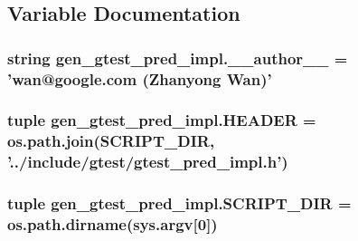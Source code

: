 \subsection{Variable Documentation}
\hypertarget{namespacegen__gtest__pred__impl_af32e92d473ee6c427929cb7ddb4db7e6}{
\subsubsection[{\-\_\-\-\_\-author\-\_\-\-\_\-}]{\setlength{\rightskip}{0pt plus 5cm}string gen\-\_\-gtest\-\_\-pred\-\_\-impl.\-\_\-\-\_\-author\-\_\-\-\_\- = 'wan@google.\-com (Zhanyong Wan)'}}\label{namespacegen__gtest__pred__impl_af32e92d473ee6c427929cb7ddb4db7e6}
\hypertarget{namespacegen__gtest__pred__impl_aab0c5147255ea91bb78a787c0c75e979}{
\subsubsection[{H\-E\-A\-D\-E\-R}]{\setlength{\rightskip}{0pt plus 5cm}tuple gen\-\_\-gtest\-\_\-pred\-\_\-impl.\-H\-E\-A\-D\-E\-R = os.\-path.\-join({\bf S\-C\-R\-I\-P\-T\-\_\-\-D\-I\-R}, '../include/gtest/gtest\-\_\-pred\-\_\-impl.\-h')}}\label{namespacegen__gtest__pred__impl_aab0c5147255ea91bb78a787c0c75e979}
\hypertarget{namespacegen__gtest__pred__impl_a60983047285657dc05c7df4189780580}{
\subsubsection[{S\-C\-R\-I\-P\-T\-\_\-\-D\-I\-R}]{\setlength{\rightskip}{0pt plus 5cm}tuple gen\-\_\-gtest\-\_\-pred\-\_\-impl.\-S\-C\-R\-I\-P\-T\-\_\-\-D\-I\-R = os.\-path.\-dirname(sys.\-argv\mbox{[}0\mbox{]})}}\label{namespacegen__gtest__pred__impl_a60983047285657dc05c7df4189780580}
